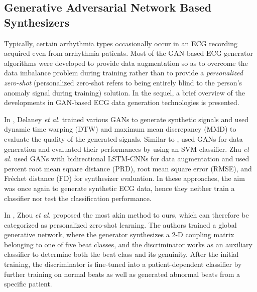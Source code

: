\documentclass[journal,transmag]{IEEEtran}
\begin{document}
\subsection{Generative Adversarial Network Based Synthesizers }
Typically, certain arrhythmia types occasionally occur in an ECG recording acquired even from arrhythmia patients. Most of the GAN-based ECG generator algorithms \cite{golany2019pgans,cab, ODE-GAN, simgans, wang2019ecg, shaker2020generalization}
were developed to provide data augmentation so as to  overcome the data imbalance problem during training rather than to provide a \textit{personalized zero-shot} (personalized zero-shot refers to being entirely blind to the person's anomaly signal during training) solution. In the sequel, a brief overview of the developments in GAN-based ECG data generation technologies is presented. 



In \cite{delaney2019synthesis}, Delaney \textit{et al.} trained various GANs to generate synthetic signals and used dynamic time warping (DTW) and maximum mean discrepancy (MMD) to evaluate the quality of the generated signals. Similar to \cite{delaney2019synthesis}, \cite{wulan2020generating} used GANs for data generation and evaluated their performances by using an SVM classifier. Zhu \textit{et al.} \cite{zhu2019electrocardiogram} used GANs with bidirectional LSTM-CNNs for data augmentation and used percent root mean square distance (PRD), root mean square error (RMSE), and Fréchet distance (FD) for synthesizer evaluation. In these approaches, the aim was once again to generate synthetic ECG data, hence they neither train a classifier nor test the classification performance.

In \cite{zhou2021fully}, Zhou \textit{et al.} proposed the most akin method to ours, which can therefore be categorized as personalized zero-shot learning. The authors trained a global generative network, where the generator synthesizes a 2-D coupling matrix belonging to one of five beat classes, and the discriminator works as an auxiliary classifier to determine both the beat class and its genuinity. After the initial training, the discriminator is fine-tuned into a patient-dependent classifier by further training on normal beats as well as generated abnormal beats from a specific patient.
\end{document}
